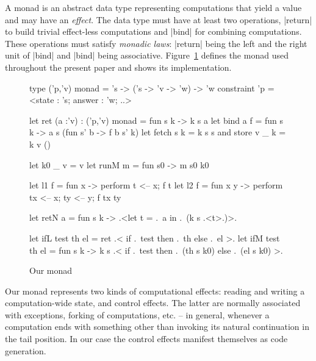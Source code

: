 \documentclass[draft]{elsart}
\begin{document}
A monad \cite{moggi-notions} is an abstract data type representing
computations that yield a value and may have an \emph{effect}.
The data type must have at least two operations, |return| to build
trivial effect-less computations and |bind| for combining
computations. These operations must satisfy \emph{monadic laws}:
|return| being the left and the right unit of |bind| and |bind| being
associative. Figure~\ref{ourmonad} defines the monad used throughout
the present paper and shows its implementation.

\begin{figure}
\begin{code}
type ('p,'v) monad = 's -> ('s -> 'v -> 'w) -> 'w
    constraint 'p = <state : 's; answer : 'w; ..>

let ret (a :'v) : ('p,'v) monad = fun s k -> k s a
let bind a f = fun s k -> a s (fun s' b -> f b s' k)
let fetch s k = k s s  and  store v _ k = k v ()

let k0 _ v = v
let runM m = fun s0 -> m s0 k0 

let l1 f = fun x     -> perform t <-- x; f t
let l2 f = fun x y   -> perform tx <-- x; ty <-- y; f tx ty

let retN a = fun s k -> .<let t = .~a in .~(k s .<t>.)>.

let ifL test th el = ret .< if .~test then .~th else .~el >.
let ifM test th el = fun s k -> 
  k s .< if .~test then .~(th s k0) else .~(el s k0) >.
\end{code}
\caption{Our monad}\label{ourmonad}
\end{figure}

Our monad represents two kinds of computational effects: reading and
writing a computation-wide state, and control effects. The latter are
normally associated with exceptions, forking of computations, etc. --
in general, whenever a computation ends with something other than
invoking its natural continuation in the tail position. In our case
the control effects manifest themselves as code generation.
\end{document}
